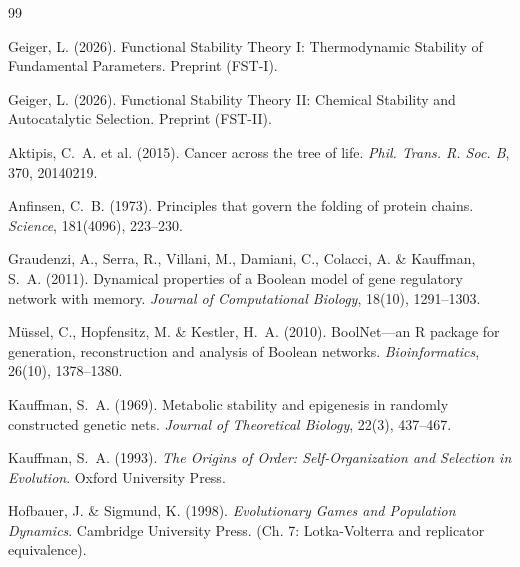 \documentclass[12pt,a4paper]{article}
\theoremstyle{remark}
\begin{document}


\begin{thebibliography}{99}

Geiger, L. (2026).
\newblock Functional Stability Theory I: Thermodynamic Stability of Fundamental Parameters.
\newblock Preprint (FST-I).

Geiger, L. (2026).
\newblock Functional Stability Theory II: Chemical Stability and Autocatalytic Selection.
\newblock Preprint (FST-II).

Aktipis, C.~A. et al. (2015).
\newblock Cancer across the tree of life.
\newblock \textit{Phil. Trans. R. Soc. B}, 370, 20140219.

Anfinsen, C.~B. (1973).
\newblock Principles that govern the folding of protein chains.
\newblock \textit{Science}, 181(4096), 223--230.

Graudenzi, A., Serra, R., Villani, M., Damiani, C., Colacci, A. \& Kauffman, S.~A. (2011).
\newblock Dynamical properties of a Boolean model of gene regulatory network with memory.
\newblock \textit{Journal of Computational Biology}, 18(10), 1291--1303.

M\"ussel, C., Hopfensitz, M. \& Kestler, H.~A. (2010).
\newblock BoolNet---an R package for generation, reconstruction and analysis of Boolean networks.
\newblock \textit{Bioinformatics}, 26(10), 1378--1380.

Kauffman, S.~A. (1969).
\newblock Metabolic stability and epigenesis in randomly constructed genetic nets.
\newblock \textit{Journal of Theoretical Biology}, 22(3), 437--467.

Kauffman, S.~A. (1993).
\newblock \textit{The Origins of Order: Self-Organization and Selection in Evolution}.
\newblock Oxford University Press.

Hofbauer, J. \& Sigmund, K. (1998).
\newblock \textit{Evolutionary Games and Population Dynamics}.
\newblock Cambridge University Press. (Ch. 7: Lotka-Volterra and replicator equivalence).


\end{thebibliography}
\end{document}
